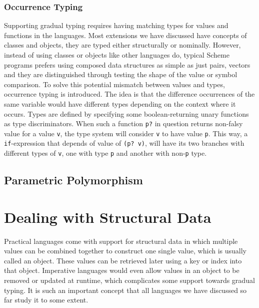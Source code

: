 \subsubsection{Occurrence Typing}


Supporting gradual typing requires having matching types for values and functions in the languages.
Most extensions we have discussed have concepts of classes and objects, they are typed either
structurally or nominally.
However, instead of using classes or objects like other languages do,
typical Scheme programs prefers using composed data structures as simple as just pairs, vectors
and they are distinguished through testing the shape of the value or symbol comparison.
To solve this potential mismatch between values and types, occurrence typing is introduced.
The idea is that the difference occurrences of the same variable would have different types
depending on the context where it occurs.
Types are defined by specifying some boolean-returning unary functions as type discriminators.
When such a function \texttt{p?} in question returns non-falsy value for a value \texttt{v},
the type system will consider \texttt{v} to have value \texttt{p}.
This way, a \texttt{if}-expression that depends of value of \texttt{(p? v)},
will have its two branches with different types of \texttt{v}, one with type \texttt{p}
and another with non-\texttt{p} type.

\subsection{Parametric Polymorphism}

\section{Dealing with Structural Data}

Practical languages come with support for structural data in which multiple values
can be combined together to construct one single value, which is usually called an object.
These values can be retrieved later using a key or index into that object.
Imperative languages would even allow values in an object to be removed or updated at runtime,
which complicates some support towards gradual typing.
It is such an important concept that all languages we have discussed so far study
it to some extent.


